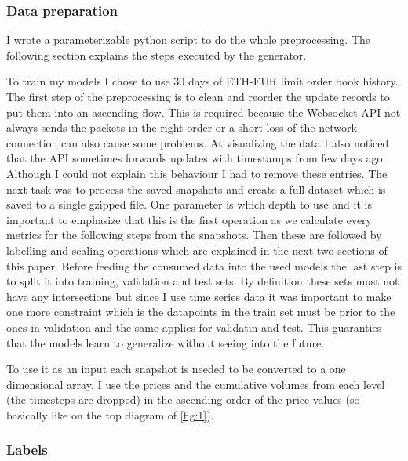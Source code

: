 \documentclass[11pt,a4paper,oneside]{article}
\begin{document}
  \subsubsection{Data preparation}
  \label{dataprep}

  I wrote a parameterizable python script to do the whole preprocessing. The following section explains the steps 
  executed by the generator.

  To train my models I chose to use 30 days of ETH-EUR limit order book history. The first step of the preprocessing is 
  to clean and reorder the update records to put them into an ascending flow. This is required because the Websocket API 
  not always sends the packets in the right order or a short loss of the network connection can also cause some 
  problems. At visualizing the data I also noticed that the API sometimes forwards updates with timestamps from few days 
  ago. Although I could not explain this behaviour I had to remove these entries. The next task was to process the 
  saved snapshots and create a full dataset which is saved to a single gzipped file. One parameter is which depth to 
  use and it is important to emphasize that this is the first operation as we calculate every metrics for the following 
  steps from the snapshots. Then these are followed by labelling and scaling operations which are explained in the next 
  two sections of this paper. Before feeding the consumed data into the used models the last step is to split it into 
  training, validation and test sets. By definition these sets must not have any intersections but since I use time 
  series data it was important to make one more constraint which is the datapoints in the train set must be prior to the 
  ones in validation and the same applies for validatin and test. This guaranties that the models learn to generalize 
  without seeing into the future. 

  To use it as an input each snapshot is needed to be converted to a one dimensional array. I use the prices and the 
  cumulative volumes from each level (the timesteps are dropped) in the ascending order of the price values (so 
  basically like on the top diagram of \autoref{fig:1}). 

  \subsubsection{Labels}
  \label{labels}
\end{document}
